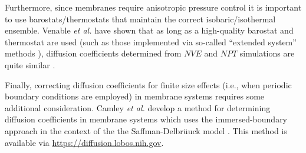\documentclass[9pt,bestpractices]{livecoms}
\begin{document}
Furthermore, since membranes require anisotropic pressure control it is important to use barostats/thermostats that maintain the correct isobaric/isothermal ensemble. Venable \textit{et al.} have shown that as long as a high-quality barostat and thermostat are used (such as those implemented via so-called ``extended system'' methods \cite{Nose1984,Hoover1985}), diffusion coefficients determined from $NVE$ and $NPT$ simulations are quite similar \cite{Venable2017}. 

Finally, correcting diffusion coefficients for finite size effects (i.e., when periodic boundary conditions are employed) in membrane systems requires some additional consideration. Camley \textit{et al.} develop a method for determining diffusion coefficients in membrane systems which uses the immersed-boundary approach in the context of the the Saffman-Delbr{\"u}uck model \cite{Camley2015}. This method is available via \url{https://diffusion.lobos.nih.gov}.





\end{document}
